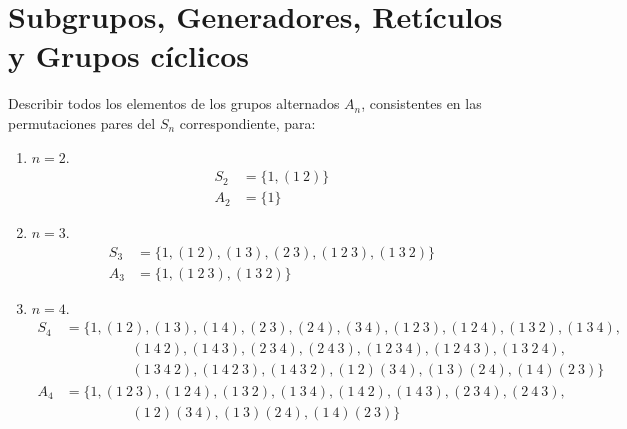 \section{Subgrupos, Generadores, Retículos y Grupos cíclicos}

\begin{ejercicio}\label{ej:3.1}
    Describir todos los elementos de los grupos alternados $A_n$, consistentes en las permutaciones pares del $S_n$ correspondiente, para:
    \begin{enumerate}
        \item $n = 2$.
        \begin{align*}
            S_2 &= \{1, (1\ 2)\}\\
            A_2 &= \{1\}
        \end{align*}
        \item $n = 3$.
        \begin{align*}
            S_3 &= \{1, (1\ 2), (1\ 3), (2\ 3), (1\ 2\ 3), (1\ 3\ 2)\}\\
            A_3 &= \{1, (1\ 2\ 3), (1\ 3\ 2)\}
        \end{align*}
        \item $n = 4$.
        \begin{align*}
            S_4 &= \{1, (1\ 2), (1\ 3), (1\ 4), (2\ 3), (2\ 4), (3\ 4), (1\ 2\ 3), (1\ 2\ 4), (1\ 3\ 2), (1\ 3\ 4),\\&\hspace{2cm} (1\ 4\ 2), (1\ 4\ 3), (2\ 3\ 4), (2\ 4\ 3), (1\ 2\ 3\ 4), (1\ 2\ 4\ 3), (1\ 3\ 2\ 4),\\&\hspace{2cm} (1\ 3\ 4\ 2), (1\ 4\ 2\ 3), (1\ 4\ 3\ 2), (1\ 2)(3\ 4), (1\ 3)(2\ 4), (1\ 4)(2\ 3)\}\\
            A_4 &= \{1, (1\ 2\ 3), (1\ 2\ 4), (1\ 3\ 2), (1\ 3\ 4), (1\ 4\ 2), (1\ 4\ 3), (2\ 3\ 4), (2\ 4\ 3),\\&\hspace{2cm} (1\ 2)(3\ 4), (1\ 3)(2\ 4), (1\ 4)(2\ 3)\}
        \end{align*}
    \end{enumerate}
\end{ejercicio}

